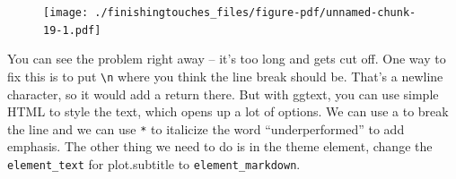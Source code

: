 \documentclass[
  letterpaper,
  DIV=11,
  numbers=noendperiod]{scrreprt}
\begin{document}
\begin{figure}[H]

{\centering \texttt{[image: ./finishingtouches\_files/figure-pdf/unnamed-chunk-19-1.pdf]}

}

\end{figure}

You can see the problem right away -- it's too long and gets cut off.
One way to fix this is to put \texttt{\textbackslash{}n} where you think
the line break should be. That's a newline character, so it would add a
return there. But with ggtext, you can use simple HTML to style the
text, which opens up a lot of options. We can use a to break the line
and we can use \texttt{*} to italicize the word ``underperformed'' to
add emphasis. The other thing we need to do is in the theme element,
change the \texttt{element\_text} for plot.subtitle to
\texttt{element\_markdown}.
\end{document}

